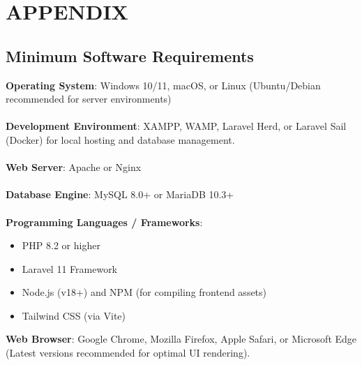 \chapter{APPENDIX}

\section{Minimum Software Requirements}
\medskip
\textbf{Operating System}: Windows 10/11, macOS, or Linux (Ubuntu/Debian recommended for server environments)
\\\\
\textbf{Development Environment}: XAMPP, WAMP, Laravel Herd, or Laravel Sail (Docker) for local hosting and database management.
\\\\
\textbf{Web Server}: Apache or Nginx
\\\\
\textbf{Database Engine}: MySQL 8.0+ or MariaDB 10.3+
\\\\
\textbf{Programming Languages / Frameworks}: 
\begin{itemize}
    \item PHP 8.2 or higher
    \item Laravel 11 Framework
    \item Node.js (v18+) and NPM (for compiling frontend assets)
    \item Tailwind CSS (via Vite)
\end{itemize}
\textbf{Web Browser}: Google Chrome, Mozilla Firefox, Apple Safari, or Microsoft Edge (Latest versions recommended for optimal UI rendering).

